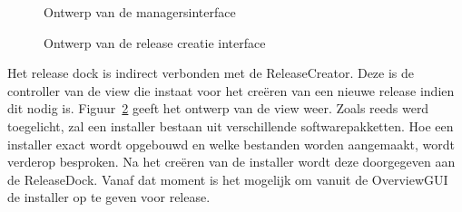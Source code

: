 \begin{figure}[!ht]
\centering
{}
\caption{Ontwerp van de managersinterface}
\label{fig:overviewGUI}
\end{figure}

\begin{figure}[!ht]
\centering
{}
\caption{Ontwerp van de release creatie interface}
\label{fig:releaseCreator}
\end{figure}

Het release dock is indirect verbonden met de ReleaseCreator.
Deze is de controller van de view die instaat voor het creëren van een nieuwe release indien dit nodig is.
Figuur~\ref{fig:releaseCreator} geeft het ontwerp van de view weer.
Zoals reeds werd toegelicht, zal een installer bestaan uit verschillende softwarepakketten.
Hoe een installer exact wordt opgebouwd en welke bestanden worden aangemaakt, wordt verderop besproken.
Na het creëren van de installer wordt deze doorgegeven aan de ReleaseDock.
Vanaf dat moment is het mogelijk om vanuit de OverviewGUI de installer op te geven voor release.

